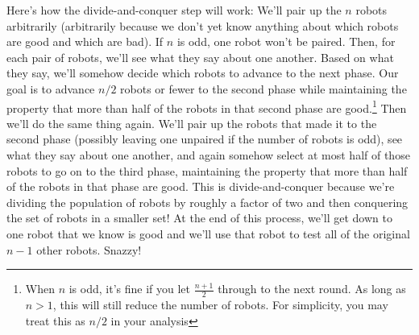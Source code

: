 \documentclass[11pt,addpoints,answers]{exam}
\begin{document}
\begin{questions}
 Here's how the divide-and-conquer step will work: We'll pair up the $n$ robots arbitrarily (arbitrarily because we don't yet know anything about 
which robots are good and which are bad).  If $n$ is odd, one robot won't be paired.  Then, for each pair of robots, we'll see what they say about one another.  Based on what they say, we'll somehow decide which robots to advance to the next phase.  Our goal is to advance $n/2$ robots  or fewer to the second phase while maintaining the property that more than half of the robots in that second phase are good.\footnote{When $n$ is odd, it's fine if you let $\frac{n+1}2$ through to the next round.  As long as $n>1$, this will still reduce the number of robots.  For simplicity, you may treat this as $n/2$ in your analysis}
Then we'll do the same thing again.
We'll pair up the robots that made it to the second phase (possibly leaving one unpaired if the number of robots is odd), see what they say about one another, and again somehow select at most half of those robots to go on to the third phase, maintaining the property that more than half of the robots in that phase are good.  This is divide-and-conquer because we're dividing the population of robots by roughly a factor of two and then conquering the set of robots in a smaller set!  At the end of this process, we'll get down to one robot that we know is good and we'll use that robot to test all of the original $n-1$ other robots.  Snazzy!

\end{questions}
\end{document}
